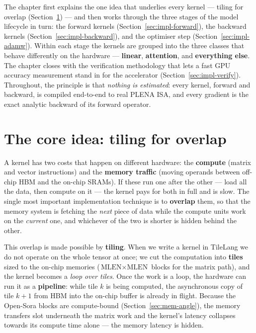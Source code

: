 \documentclass[11pt]{report}
\begin{document}
The chapter first explains the one idea that underlies every kernel ---
tiling for overlap (Section~\ref{sec:tiling}) --- and then works through the
three stages of the model lifecycle in turn: the forward kernels
(Section~\ref{sec:impl-forward}), the backward kernels
(Section~\ref{sec:impl-backward}), and the optimiser step
(Section~\ref{sec:impl-adamw}). Within each stage the kernels are grouped
into the three classes that behave differently on the hardware ---
\textbf{linear}, \textbf{attention}, and \textbf{everything else}. The
chapter closes with the verification methodology that lets a fast GPU
accuracy measurement stand in for the accelerator
(Section~\ref{sec:impl-verify}). Throughout, the principle is that
\emph{nothing is estimated}: every kernel, forward and backward, is compiled
end-to-end to real PLENA ISA, and every gradient is the exact analytic
backward of its forward operator.

\section{The core idea: tiling for overlap}
\label{sec:tiling}

A kernel has two costs that happen on different hardware: the
\textbf{compute} (matrix and vector instructions) and the \textbf{memory
traffic} (moving operands between off-chip HBM and the on-chip SRAMs). If
these run one after the other --- load all the data, then compute on it ---
the kernel pays for both in full and is slow. The single most important
implementation technique is to \textbf{overlap} them, so that the memory
system is fetching the \emph{next} piece of data while the compute units
work on the \emph{current} one, and whichever of the two is shorter is
hidden behind the other.

This overlap is made possible by \textbf{tiling}. When we write a kernel in
TileLang we do not operate on the whole tensor at once; we cut the
computation into \textbf{tiles} sized to the on-chip memories
($\text{MLEN}\times\text{MLEN}$ blocks for the matrix path), and the kernel
becomes a \emph{loop over tiles}. Once the work is a loop, the hardware can
run it as a \textbf{pipeline}: while tile $k$ is being computed, the
asynchronous copy of tile $k{+}1$ from HBM into the on-chip buffer is
already in flight. Because the Open-Sora blocks are compute-bound
(Section~\ref{sec:mem-angle}), the memory transfers slot underneath the
matrix work and the kernel's latency collapses towards its compute time
alone --- the memory latency is hidden.
\end{document}

